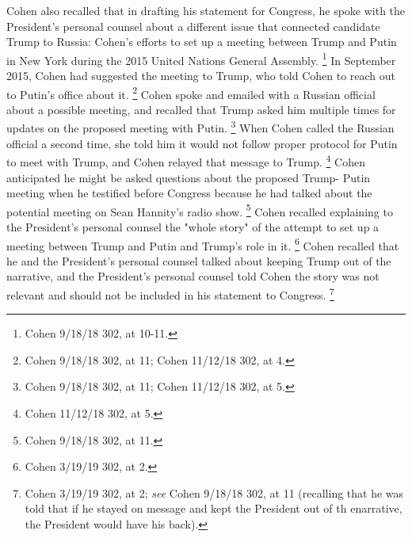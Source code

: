 Cohen also recalled that in drafting his statement for Congress, he spoke with the President's personal counsel about a different issue that connected candidate Trump to Russia: Cohen's efforts to set up a meeting between Trump and Putin in New York during the 2015 United Nations General Assembly.%
\footnote{Cohen 9/18/18 302, at 10-11.}
In September 2015, Cohen had suggested the meeting to Trump, who told Cohen to reach out to Putin's office about it.%
\footnote{Cohen 9/18/18 302, at 11;
Cohen 11/12/18 302, at 4.}
Cohen spoke and emailed with a Russian official about a possible meeting, and recalled that Trump asked him multiple times for updates on the proposed meeting with Putin.%
\footnote{Cohen 9/18/18 302, at 11;
Cohen 11/12/18 302, at 5.}
When Cohen called the Russian official a second time, she told him it would not follow proper protocol for Putin to meet with Trump, and Cohen relayed that message to Trump.%
\footnote{Cohen 11/12/18 302, at 5.}
Cohen anticipated he might be asked questions about the proposed Trump- Putin meeting when he testified before Congress because he had talked about the potential meeting on Sean Hannity's radio show.%
\footnote{Cohen 9/18/18 302, at 11.}
Cohen recalled explaining to the President's personal counsel the "whole story" of the attempt to set up a meeting between Trump and Putin and Trump's role in it.%
\footnote{Cohen 3/19/19 302, at 2.}
Cohen recalled that he and the President's personal counsel talked about keeping Trump out of the narrative, and the President's personal counsel told Cohen the story was not relevant and should not be included in his statement to Congress.%
\footnote{Cohen 3/19/19 302, at 2;
\textit{see} Cohen 9/18/18 302, at 11 (recalling that he was told that if he stayed on message and kept the President out of th enarrative, the President would have his back).}

